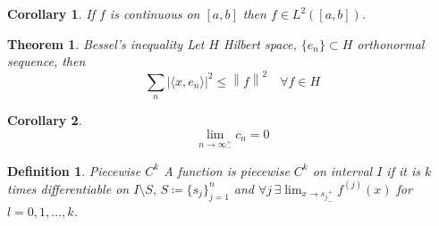 \documentclass{article}
\newtheorem{theorem}{Theorem}
\newtheorem{definition}{Definition}
\newtheorem{corollary}{Corollary}[theorem]
\newcommand{\norm}[1]{\left\lVert#1\right\rVert}
\begin{document}
\begin{corollary}
	If $f$ is continuous on $[a, b]$ then $f \in L^2([a, b])$.
\end{corollary}

\begin{theorem}{Bessel's inequality}
	Let $H$ Hilbert space, $\{e_n\} \subset H$ orthonormal sequence, then
	$$ \sum_n \lvert \langle x, e_n \rangle \rvert^2 \le \norm{f}^2 \quad \forall f \in H $$
\end{theorem}

\begin{corollary}
	$$ \lim_{n \to \infty_-^+} c_n = 0 $$
\end{corollary}

\begin{definition}{Piecewise $C^k$}
	A function is piecewise $C^k$ on interval $I$ if it is $k$ times differentiable
	on $I \setminus S, \, S \coloneqq \{s_j\}_{j=1}^n$
	and $\forall j \, \exists \lim_{x \to {s_j}_-^+} f^{(j)}(x)$ for $l = 0, 1, \ldots, k$.
\end{definition}
\end{document}
